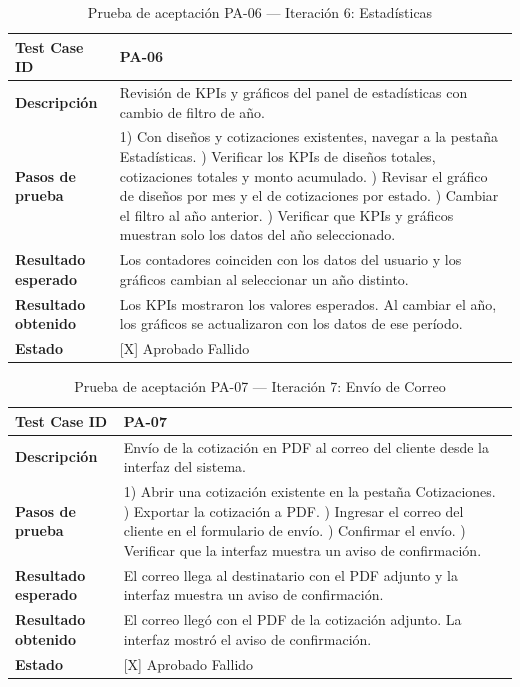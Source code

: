 ﻿\documentclass{iccmemoria}
\begin{document}
\begin{table}[H]
\centering
\caption{Prueba de aceptación PA-06 — Iteración 6: Estadísticas}
\label{tab:pa06}
\begin{tabular}{|p{4cm}|p{9.5cm}|}
\hline
\textbf{Test Case ID} & PA-06 \\
\hline
\textbf{Descripción} & Revisión de KPIs y gráficos del panel de estadísticas con cambio de filtro de año. \\
\hline
\textbf{Pasos de prueba} &
1) Con diseños y cotizaciones existentes, navegar a la pestaña Estadísticas. \newline
2) Verificar los KPIs de diseños totales, cotizaciones totales y monto acumulado. \newline
3) Revisar el gráfico de diseños por mes y el de cotizaciones por estado. \newline
4) Cambiar el filtro al año anterior. \newline
5) Verificar que KPIs y gráficos muestran solo los datos del año seleccionado. \\
\hline
\textbf{Resultado esperado} & Los contadores coinciden con los datos del usuario y los gráficos cambian al seleccionar un año distinto. \\
\hline
\textbf{Resultado obtenido} & Los KPIs mostraron los valores esperados. Al cambiar el año, los gráficos se actualizaron con los datos de ese período. \\
\hline
\textbf{Estado} & {[X]} Aprobado \quad {[ ]} Fallido \\
\hline
\end{tabular}
\end{table}

\begin{table}[H]
\centering
\caption{Prueba de aceptación PA-07 — Iteración 7: Envío de Correo}
\label{tab:pa07}
\begin{tabular}{|p{4cm}|p{9.5cm}|}
\hline
\textbf{Test Case ID} & PA-07 \\
\hline
\textbf{Descripción} & Envío de la cotización en PDF al correo del cliente desde la interfaz del sistema. \\
\hline
\textbf{Pasos de prueba} &
1) Abrir una cotización existente en la pestaña Cotizaciones. \newline
2) Exportar la cotización a PDF. \newline
3) Ingresar el correo del cliente en el formulario de envío. \newline
4) Confirmar el envío. \newline
5) Verificar que la interfaz muestra un aviso de confirmación. \\
\hline
\textbf{Resultado esperado} & El correo llega al destinatario con el PDF adjunto y la interfaz muestra un aviso de confirmación. \\
\hline
\textbf{Resultado obtenido} & El correo llegó con el PDF de la cotización adjunto. La interfaz mostró el aviso de confirmación. \\
\hline
\textbf{Estado} & {[X]} Aprobado \quad {[ ]} Fallido \\
\hline
\end{tabular}
\end{table}
\end{document}
